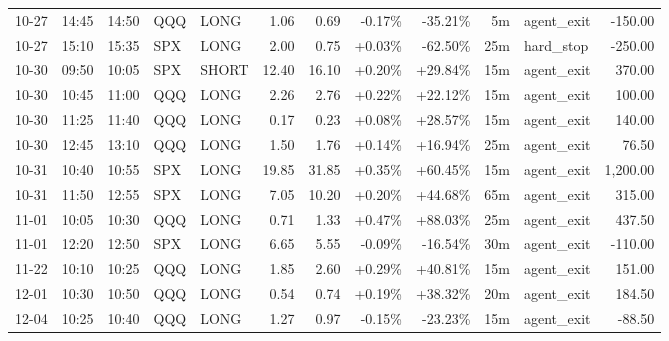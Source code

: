 \documentclass[11pt,a4paper]{article}
\begin{document}
\begin{center}
\begin{longtable}{>{\color{txtmain}}l l l l l r r r r r >{\color{txtmain}}l r}
10-27 & 14:45 & 14:50 & QQQ & LONG & 1.06 & 0.69 & \textcolor{lossred}{-0.17\%} & \textcolor{lossred}{-35.21\%} & 5m & agent\_exit & \textcolor{lossred}{-150.00} \\
10-27 & 15:10 & 15:35 & SPX & LONG & 2.00 & 0.75 & \textcolor{wingreen}{+0.03\%} & \textcolor{lossred}{-62.50\%} & 25m & hard\_stop & \textcolor{lossred}{-250.00} \\
10-30 & 09:50 & 10:05 & SPX & SHORT & 12.40 & 16.10 & \textcolor{wingreen}{+0.20\%} & \textcolor{wingreen}{+29.84\%} & 15m & agent\_exit & \textcolor{wingreen}{370.00} \\
10-30 & 10:45 & 11:00 & QQQ & LONG & 2.26 & 2.76 & \textcolor{wingreen}{+0.22\%} & \textcolor{wingreen}{+22.12\%} & 15m & agent\_exit & \textcolor{wingreen}{100.00} \\
10-30 & 11:25 & 11:40 & QQQ & LONG & 0.17 & 0.23 & \textcolor{wingreen}{+0.08\%} & \textcolor{wingreen}{+28.57\%} & 15m & agent\_exit & \textcolor{wingreen}{140.00} \\
10-30 & 12:45 & 13:10 & QQQ & LONG & 1.50 & 1.76 & \textcolor{wingreen}{+0.14\%} & \textcolor{wingreen}{+16.94\%} & 25m & agent\_exit & \textcolor{wingreen}{76.50} \\
10-31 & 10:40 & 10:55 & SPX & LONG & 19.85 & 31.85 & \textcolor{wingreen}{+0.35\%} & \textcolor{wingreen}{+60.45\%} & 15m & agent\_exit & \textcolor{wingreen}{1,200.00} \\
10-31 & 11:50 & 12:55 & SPX & LONG & 7.05 & 10.20 & \textcolor{wingreen}{+0.20\%} & \textcolor{wingreen}{+44.68\%} & 65m & agent\_exit & \textcolor{wingreen}{315.00} \\
11-01 & 10:05 & 10:30 & QQQ & LONG & 0.71 & 1.33 & \textcolor{wingreen}{+0.47\%} & \textcolor{wingreen}{+88.03\%} & 25m & agent\_exit & \textcolor{wingreen}{437.50} \\
11-01 & 12:20 & 12:50 & SPX & LONG & 6.65 & 5.55 & \textcolor{lossred}{-0.09\%} & \textcolor{lossred}{-16.54\%} & 30m & agent\_exit & \textcolor{lossred}{-110.00} \\
11-22 & 10:10 & 10:25 & QQQ & LONG & 1.85 & 2.60 & \textcolor{wingreen}{+0.29\%} & \textcolor{wingreen}{+40.81\%} & 15m & agent\_exit & \textcolor{wingreen}{151.00} \\
12-01 & 10:30 & 10:50 & QQQ & LONG & 0.54 & 0.74 & \textcolor{wingreen}{+0.19\%} & \textcolor{wingreen}{+38.32\%} & 20m & agent\_exit & \textcolor{wingreen}{184.50} \\
12-04 & 10:25 & 10:40 & QQQ & LONG & 1.27 & 0.97 & \textcolor{lossred}{-0.15\%} & \textcolor{lossred}{-23.23\%} & 15m & agent\_exit & \textcolor{lossred}{-88.50} \\

\end{longtable}
\end{center}
\end{document}
